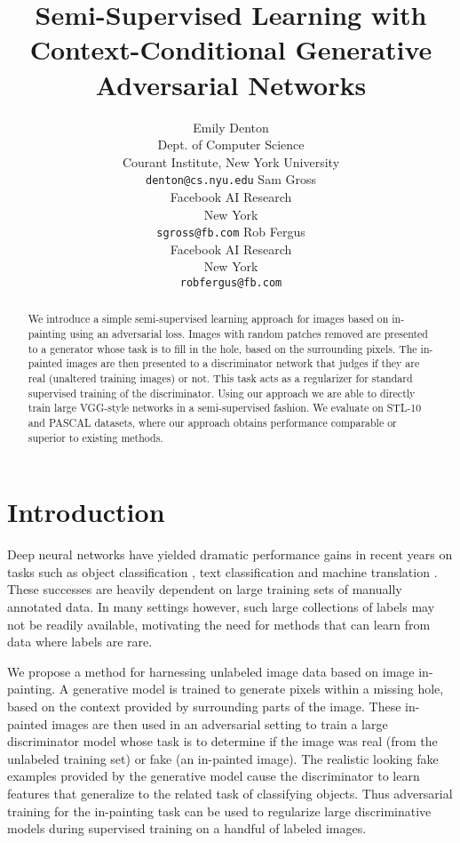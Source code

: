 \documentclass{article} \usepackage{iclr2017_conference,times}
\title{Semi-Supervised Learning with \\Context-Conditional Generative \\Adversarial Networks}
\author{Emily Denton\\
Dept. of Computer Science\\
Courant Institute, New York University\\
\texttt{denton@cs.nyu.edu}
\And
Sam Gross\\
Facebook AI Research \\
New York\\
\texttt{sgross@fb.com}
\And
Rob Fergus \\
Facebook AI Research \\
New York\\
\texttt{robfergus@fb.com}
}
\begin{document}
\maketitle  

\vspace{-5mm}
\begin{abstract}
  We introduce a simple semi-supervised learning approach for images based on
  in-painting using an adversarial loss. Images with random
  patches removed are presented to a generator whose task is to fill
  in the hole, based on the surrounding pixels. The in-painted images
  are then presented to a discriminator network that judges if they
  are real (unaltered training images) or not. This task acts as a
  regularizer for standard supervised training of the
  discriminator. Using our approach we are able to directly train
  large VGG-style networks in a semi-supervised fashion. We evaluate
  on STL-10 and PASCAL datasets, where our approach obtains
  performance comparable or superior to existing methods.
\end{abstract}


\section{Introduction}

Deep neural networks have yielded dramatic performance gains in recent
years on tasks such as object classification \citep{krizhevsky2012},
text classification \citep{zhang2015} and machine translation
\citep{sutskever2014,bahdanau2015}.  These successes are heavily
dependent on large training sets of manually annotated data.  In many
settings however, such large collections of labels may not be readily
available, motivating the need for methods that can learn from data
where labels are rare.

We propose a method for harnessing unlabeled image data based on
image in-painting. A generative model is trained to generate pixels within a
missing hole, based on the context provided by surrounding parts of
the image. These in-painted images are then used in an adversarial
setting \citep{goodfellow2014} to train a large discriminator model whose task is
to determine if the image was real (from the unlabeled training
set) or fake (an in-painted image). The realistic looking
fake examples provided by the generative model cause the discriminator
to learn features that generalize to the related task of classifying
objects. Thus adversarial training for the in-painting task can be
used to regularize large discriminative models during supervised
training on a handful of labeled images. 
\end{document}
